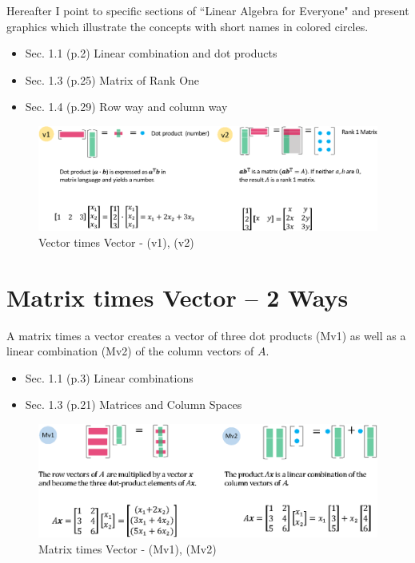 \documentclass[letterpaper]{article}
\begin{document}
Hereafter I point to specific sections of ``Linear Algebra for Everyone" 
and present graphics which illustrate the concepts with short names
in colored circles.

\begin{itemize}
  \item Sec. 1.1 (p.2) Linear combination and dot products
  \item Sec. 1.3 (p.25) Matrix of Rank One
  \item Sec. 1.4 (p.29) Row way and column way
\end{itemize} 


\begin{figure}[H]
  \includegraphics[keepaspectratio, width=\linewidth]{VectorTimesVector.eps}
  \caption{Vector times Vector - (v1), (v2)}
\end{figure}

\section{Matrix times Vector -- 2 Ways}

A matrix times a vector creates a vector of three dot products (Mv1)
as well as a linear combination (Mv2) of the column vectors of $A$.

\begin{itemize}
  \item Sec. 1.1 (p.3) Linear combinations
  \item Sec. 1.3 (p.21) Matrices and Column Spaces
\end{itemize} 

\begin{figure}[H]
  \includegraphics[keepaspectratio, width=\linewidth]{MatrixTimesVector.eps}
  \caption{Matrix times Vector - (Mv1), (Mv2)}
\end{figure}
\end{document}
